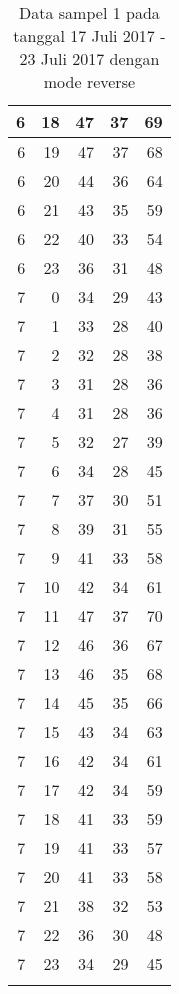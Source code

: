 \begin{longtable}{|r|r|r|r|r|}
    \hline
    6     & 18    & 47    & 37    & 69 \\
    \hline
    6     & 19    & 47    & 37    & 68 \\
    \hline
    6     & 20    & 44    & 36    & 64 \\
    \hline
    6     & 21    & 43    & 35    & 59 \\
    \hline
    6     & 22    & 40    & 33    & 54 \\
    \hline
    6     & 23    & 36    & 31    & 48 \\
    \hline
    7     & 0     & 34    & 29    & 43 \\
    \hline
    7     & 1     & 33    & 28    & 40 \\
    \hline
    7     & 2     & 32    & 28    & 38 \\
    \hline
    7     & 3     & 31    & 28    & 36 \\
    \hline
    7     & 4     & 31    & 28    & 36 \\
    \hline
    7     & 5     & 32    & 27    & 39 \\
    \hline
    7     & 6     & 34    & 28    & 45 \\
    \hline
    7     & 7     & 37    & 30    & 51 \\
    \hline
    7     & 8     & 39    & 31    & 55 \\
    \hline
    7     & 9     & 41    & 33    & 58 \\
    \hline
    7     & 10    & 42    & 34    & 61 \\
    \hline
    7     & 11    & 47    & 37    & 70 \\
    \hline
    7     & 12    & 46    & 36    & 67 \\
    \hline
    7     & 13    & 46    & 35    & 68 \\
    \hline
    7     & 14    & 45    & 35    & 66 \\
    \hline
    7     & 15    & 43    & 34    & 63 \\
    \hline
    7     & 16    & 42    & 34    & 61 \\
    \hline
    7     & 17    & 42    & 34    & 59 \\
    \hline
    7     & 18    & 41    & 33    & 59 \\
    \hline
    7     & 19    & 41    & 33    & 57 \\
    \hline
    7     & 20    & 41    & 33    & 58 \\
    \hline
    7     & 21    & 38    & 32    & 53 \\
    \hline
    7     & 22    & 36    & 30    & 48 \\
    \hline
    7     & 23    & 34    & 29    & 45 \\
    \hline
		\caption{Data sampel 1 pada tanggal 17 Juli 2017 - 23 Juli 2017 dengan mode reverse}
  \label{tab:datasample117072017reverse}%
\end{longtable}%


